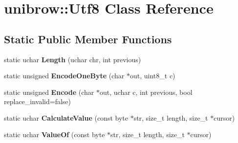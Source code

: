 \hypertarget{classunibrow_1_1_utf8}{}\section{unibrow\+:\+:Utf8 Class Reference}
\label{classunibrow_1_1_utf8}
\subsection*{Static Public Member Functions}
\begin{DoxyCompactItemize}
\item 
static uchar {\bfseries Length} (uchar chr, int previous)\hypertarget{classunibrow_1_1_utf8_a5c6a30a8610649fee6dbb05057862113}{}\label{classunibrow_1_1_utf8_a5c6a30a8610649fee6dbb05057862113}

\item 
static unsigned {\bfseries Encode\+One\+Byte} (char $\ast$out, uint8\+\_\+t c)\hypertarget{classunibrow_1_1_utf8_a944c72d1ddbcccc8f6386f1ff971404f}{}\label{classunibrow_1_1_utf8_a944c72d1ddbcccc8f6386f1ff971404f}

\item 
static unsigned {\bfseries Encode} (char $\ast$out, uchar c, int previous, bool replace\+\_\+invalid=false)\hypertarget{classunibrow_1_1_utf8_acf0af099acd418650bf1a8080f14e926}{}\label{classunibrow_1_1_utf8_acf0af099acd418650bf1a8080f14e926}

\item 
static uchar {\bfseries Calculate\+Value} (const byte $\ast$str, size\+\_\+t length, size\+\_\+t $\ast$cursor)\hypertarget{classunibrow_1_1_utf8_a7c355e692f5abdea8fcf4aff60adb728}{}\label{classunibrow_1_1_utf8_a7c355e692f5abdea8fcf4aff60adb728}

\item 
static uchar {\bfseries Value\+Of} (const byte $\ast$str, size\+\_\+t length, size\+\_\+t $\ast$cursor)\hypertarget{classunibrow_1_1_utf8_a694bc73a14569ce19c6baa4b6caf1c99}{}\label{classunibrow_1_1_utf8_a694bc73a14569ce19c6baa4b6caf1c99}

\end{DoxyCompactItemize}
